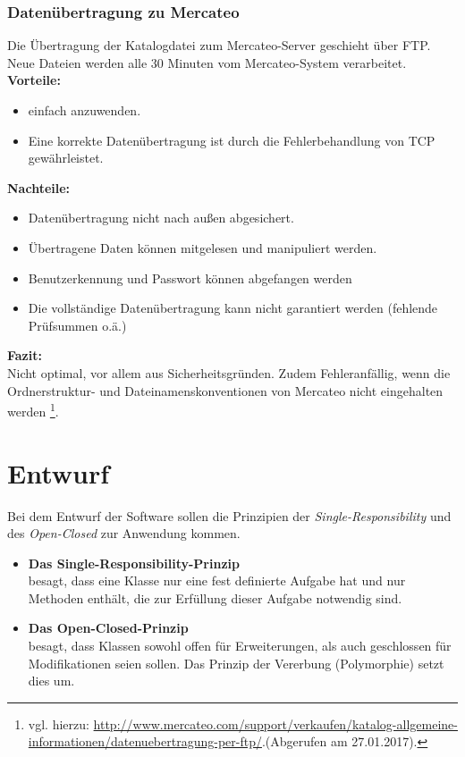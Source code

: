 	
	
	\subsubsection{Datenübertragung zu Mercateo}
	
	Die Übertragung der Katalogdatei zum Mercateo-Server geschieht über FTP. Neue Dateien werden alle 30 Minuten vom Mercateo-System verarbeitet.\\
	\textbf{Vorteile:}
 	\begin{itemize}[noitemsep]
   	\item einfach anzuwenden.
   	\item Eine korrekte Datenübertragung ist durch die Fehlerbehandlung von TCP gewährleistet.
   	\end{itemize}
	\textbf{Nachteile:}
   	\begin{itemize}[noitemsep]
   	\item Datenübertragung nicht nach außen abgesichert.
   	\item Übertragene Daten können mitgelesen und manipuliert werden.
   	\item Benutzerkennung und Passwort können abgefangen werden
   	\item Die vollständige Datenübertragung kann nicht garantiert werden (fehlende Prüfsummen o.ä.)
   	\end{itemize}
   	\textbf{Fazit:}\\
	Nicht optimal, vor allem aus Sicherheitsgründen. Zudem Fehleranfällig, wenn die Ordnerstruktur- und Dateinamenskonventionen von Mercateo nicht eingehalten werden \footnote{vgl. hierzu: \url{http://www.mercateo.com/support/verkaufen/katalog-allgemeine-informationen/datenuebertragung-per-ftp/}.(Abgerufen am 27.01.2017).}.

	\pagebreak	
	\section{Entwurf}
	
	Bei dem Entwurf der Software sollen die Prinzipien der \textit{Single-Responsibility} und des \textit{Open-Closed} zur Anwendung kommen.
	
	\begin{itemize}
	\item \textbf{Das Single-Responsibility-Prinzip}\\besagt, dass eine Klasse nur eine fest definierte Aufgabe hat und nur Methoden enthält, die zur Erfüllung dieser Aufgabe notwendig sind.
	\item \textbf{Das Open-Closed-Prinzip}\\ besagt, dass Klassen sowohl offen für Erweiterungen, als auch geschlossen für Modifikationen seien sollen. Das Prinzip der Vererbung (Polymorphie) setzt dies um.
	\end{itemize}
	

